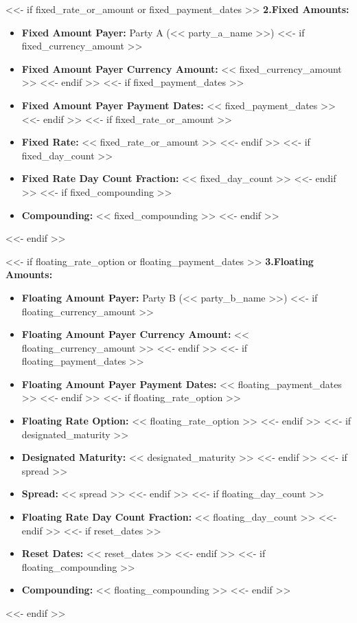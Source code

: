 \documentclass[11pt, a4paper]{article}
\begin{document}
<<- if fixed_rate_or_amount or fixed_payment_dates >>
\vspace{0.3cm}
\noindent \textbf{2.\quad Fixed Amounts:}
\begin{itemize}[leftmargin=2cm, label={}, itemsep=3pt]
    \item \textbf{Fixed Amount Payer:} Party A (<< party_a_name >>)
<<- if fixed_currency_amount >>
    \item \textbf{Fixed Amount Payer Currency Amount:} << fixed_currency_amount >>
<<- endif >>
<<- if fixed_payment_dates >>
    \item \textbf{Fixed Amount Payer Payment Dates:} << fixed_payment_dates >>
<<- endif >>
<<- if fixed_rate_or_amount >>
    \item \textbf{Fixed Rate:} << fixed_rate_or_amount >>
<<- endif >>
<<- if fixed_day_count >>
    \item \textbf{Fixed Rate Day Count Fraction:} << fixed_day_count >>
<<- endif >>
<<- if fixed_compounding >>
    \item \textbf{Compounding:} << fixed_compounding >>
<<- endif >>
\end{itemize}
<<- endif >>

<<- if floating_rate_option or floating_payment_dates >>
\vspace{0.3cm}
\noindent \textbf{3.\quad Floating Amounts:}
\begin{itemize}[leftmargin=2cm, label={}, itemsep=3pt]
    \item \textbf{Floating Amount Payer:} Party B (<< party_b_name >>)
<<- if floating_currency_amount >>
    \item \textbf{Floating Amount Payer Currency Amount:} << floating_currency_amount >>
<<- endif >>
<<- if floating_payment_dates >>
    \item \textbf{Floating Amount Payer Payment Dates:} << floating_payment_dates >>
<<- endif >>
<<- if floating_rate_option >>
    \item \textbf{Floating Rate Option:} << floating_rate_option >>
<<- endif >>
<<- if designated_maturity >>
    \item \textbf{Designated Maturity:} << designated_maturity >>
<<- endif >>
<<- if spread >>
    \item \textbf{Spread:} << spread >>
<<- endif >>
<<- if floating_day_count >>
    \item \textbf{Floating Rate Day Count Fraction:} << floating_day_count >>
<<- endif >>
<<- if reset_dates >>
    \item \textbf{Reset Dates:} << reset_dates >>
<<- endif >>
<<- if floating_compounding >>
    \item \textbf{Compounding:} << floating_compounding >>
<<- endif >>
\end{itemize}
<<- endif >>
\end{document}
